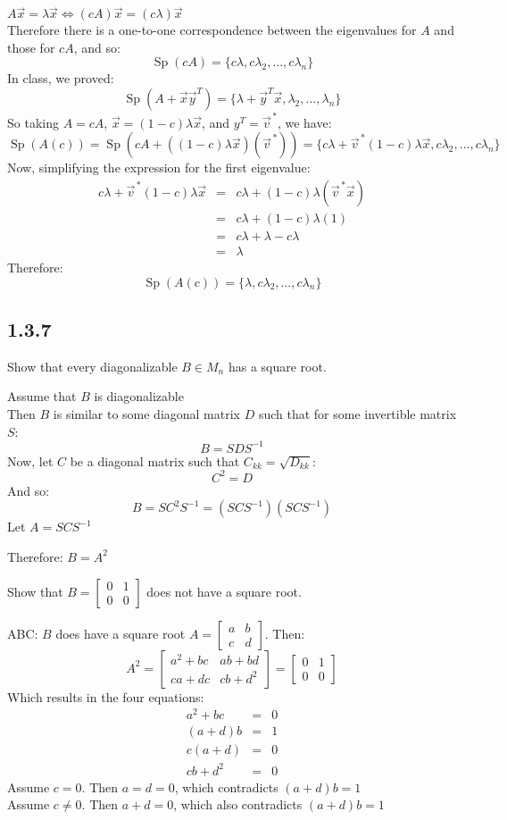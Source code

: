 \documentclass[letterpaper,12pt,fleqn]{article}
\renewcommand{\l}{\lambda}
\newcommand{\vx}{\vec{x}}
\newcommand{\vy}{\vec{y}}
\newcommand{\vv}{\vec{v}}
\DeclareMathOperator{\Sp}{Sp}
\begin{document}
$A\vx=\l\vx\iff(cA)\vx=(c\l)\vx$ \\
Therefore there is a one-to-one correspondence between the eigenvalues for
$A$ and those for $cA$, and so:
\[\Sp(cA)=\{c\l,c\l_2,\ldots,c\l_n\}\]
In class, we proved:
\[\Sp(A+\vx\vy^T)=\{\l+\vy^T\vx,\l_2,\ldots,\l_n\}\]
So taking $A=cA$, $\vx=(1-c)\l\vx$, and $y^T=\vv^{\,*}$, we have:
\[\Sp(A(c))=\Sp(cA+((1-c)\l\vx)(\vv^{\,*}))=
\{c\l+\vv^{\,*}(1-c)\l\vx,c\l_2,\ldots,c\l_n\}\]
Now, simplifying the expression for the first eigenvalue:
\begin{eqnarray*}
  c\l+\vv^{\,*}(1-c)\l\vx &=& c\l+(1-c)\l(\vv^{\,*}\vx) \\
  &=& c\l+(1-c)\l(1) \\
  &=& c\l+\l-c\l \\
  &=& \l
\end{eqnarray*}
Therefore:
\[\Sp(A(c))=\{\l,c\l_2,\ldots,c\l_n\}\]

\subsection*{1.3.7}

Show that every diagonalizable $B\in M_n$ has a square root.

Assume that $B$ is diagonalizable \\
Then $B$ is similar to some diagonal matrix $D$ such that for some invertible
matrix $S$:
\[B=SDS^{-1}\]
Now, let $C$ be a diagonal matrix such that $C_{kk}=\sqrt{D_{kk}}$:
\[C^2=D\]
And so:
\[B=SC^2S^{-1}=(SCS^{-1})(SCS^{-1})\]
Let $A=SCS^{-1}$

Therefore: $B=A^2$

Show that $B=\begin{bmatrix} 0 & 1 \\ 0 & 0 \end{bmatrix}$ does not have a
square root.

ABC: $B$ does have a square root
$A=\begin{bmatrix} a & b \\ c & d \end{bmatrix}$. Then:
\[A^2=\begin{bmatrix} a^2+bc & ab+bd \\ ca+dc & cb+d^2 \end{bmatrix}=
\begin{bmatrix} 0 & 1 \\ 0 & 0 \end{bmatrix}\]
Which results in the four equations:
\begin{eqnarray*}
  a^2+bc &=& 0 \\
  (a+d)b &=& 1 \\
  c(a+d) &=& 0 \\
  cb+d^2 &=& 0
\end{eqnarray*}
Assume $c=0$. Then $a=d=0$, which contradicts $(a+d)b=1$ \\
Assume $c\ne0$. Then $a+d=0$, which also contradicts $(a+d)b=1$
\end{document}
